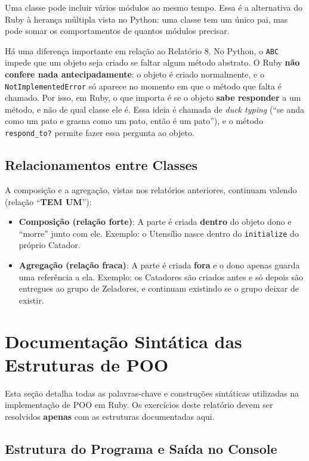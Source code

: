 Uma classe pode incluir vários módulos ao mesmo tempo. Essa é a alternativa do Ruby à herança
múltipla vista no Python: uma classe tem um único pai, mas pode somar os comportamentos de
quantos módulos precisar.

Há uma diferença importante em relação ao Relatório 8. No Python, o \texttt{ABC} impede que um
objeto seja criado se faltar algum método abstrato. O Ruby \textbf{não confere nada
antecipadamente}: o objeto é criado normalmente, e o \texttt{NotImplementedError} só aparece no
momento em que o método que falta é chamado. Por isso, em Ruby, o que importa é se o objeto
\textbf{sabe responder} a um método, e não de qual classe ele é. Essa ideia é chamada de
\textit{duck typing} (``se anda como um pato e grasna como um pato, então é um pato''), e o
método \texttt{respond\_to?} permite fazer essa pergunta ao objeto.

\subsection{Relacionamentos entre Classes}

A composição e a agregação, vistas nos relatórios anteriores, continuam valendo (relação
``\textbf{TEM UM}''):

\begin{itemize}
    \item \textbf{Composição (relação forte)}: A parte é criada \textbf{dentro} do objeto dono e
    ``morre'' junto com ele. Exemplo: o Utensílio nasce dentro do \texttt{initialize} do próprio
    Catador.

    \item \textbf{Agregação (relação fraca)}: A parte é criada \textbf{fora} e o dono apenas
    guarda uma referência a ela. Exemplo: os Catadores são criados antes e só depois são
    entregues ao grupo de Zeladores, e continuam existindo se o grupo deixar de existir.
\end{itemize}

\section{Documentação Sintática das Estruturas de POO}

Esta seção detalha todas as palavras-chave e construções sintáticas utilizadas na implementação
de POO em Ruby. Os exercícios deste relatório devem ser resolvidos \textbf{apenas} com as
estruturas documentadas aqui.

\subsection{Estrutura do Programa e Saída no Console}

